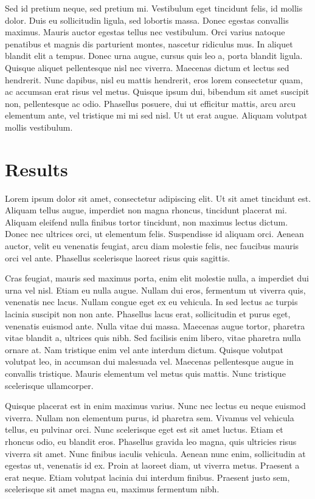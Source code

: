 \documentclass[conference]{IEEEtran}
\begin{document}
Sed id pretium neque, sed pretium mi. Vestibulum eget tincidunt felis, id mollis dolor. Duis eu sollicitudin ligula, sed lobortis massa. Donec egestas convallis maximus. Mauris auctor egestas tellus nec vestibulum. Orci varius natoque penatibus et magnis dis parturient montes, nascetur ridiculus mus. In aliquet blandit elit a tempus. Donec urna augue, cursus quis leo a, porta blandit ligula. Quisque aliquet pellentesque nisl nec viverra. Maecenas dictum et lectus sed hendrerit. Nunc dapibus, nisl eu mattis hendrerit, eros lorem consectetur quam, ac accumsan erat risus vel metus. Quisque ipsum dui, bibendum sit amet suscipit non, pellentesque ac odio. Phasellus posuere, dui ut efficitur mattis, arcu arcu elementum ante, vel tristique mi mi sed nisl. Ut ut erat augue. Aliquam volutpat mollis vestibulum. 

\section{Results}

Lorem ipsum dolor sit amet, consectetur adipiscing elit. Ut sit amet tincidunt est. Aliquam tellus augue, imperdiet non magna rhoncus, tincidunt placerat mi. Aliquam eleifend nulla finibus tortor tincidunt, non maximus lectus dictum. Donec nec ultrices orci, ut elementum felis. Suspendisse id aliquam orci. Aenean auctor, velit eu venenatis feugiat, arcu diam molestie felis, nec faucibus mauris orci vel ante. Phasellus scelerisque laoreet risus quis sagittis.

Cras feugiat, mauris sed maximus porta, enim elit molestie nulla, a imperdiet dui urna vel nisl. Etiam eu nulla augue. Nullam dui eros, fermentum ut viverra quis, venenatis nec lacus. Nullam congue eget ex eu vehicula. In sed lectus ac turpis lacinia suscipit non non ante. Phasellus lacus erat, sollicitudin et purus eget, venenatis euismod ante. Nulla vitae dui massa. Maecenas augue tortor, pharetra vitae blandit a, ultrices quis nibh. Sed facilisis enim libero, vitae pharetra nulla ornare at. Nam tristique enim vel ante interdum dictum. Quisque volutpat volutpat leo, in accumsan dui malesuada vel. Maecenas pellentesque augue in convallis tristique. Mauris elementum vel metus quis mattis. Nunc tristique scelerisque ullamcorper.

Quisque placerat est in enim maximus varius. Nunc nec lectus eu neque euismod viverra. Nullam non elementum purus, id pharetra sem. Vivamus vel vehicula tellus, eu pulvinar orci. Nunc scelerisque eget est sit amet luctus. Etiam et rhoncus odio, eu blandit eros. Phasellus gravida leo magna, quis ultricies risus viverra sit amet. Nunc finibus iaculis vehicula. Aenean nunc enim, sollicitudin at egestas ut, venenatis id ex. Proin at laoreet diam, ut viverra metus. Praesent a erat neque. Etiam volutpat lacinia dui interdum finibus. Praesent justo sem, scelerisque sit amet magna eu, maximus fermentum nibh.
\end{document}
